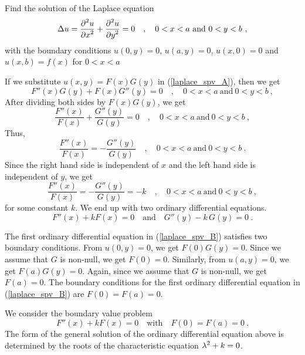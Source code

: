 \begin{egg}
Find the solution of the Laplace equation
\begin{equation} \label{laplace_spv_A}
\Delta u = \frac{\displaystyle \partial^{2}{u}} {\displaystyle \partial x^{2}} + \frac{\displaystyle \partial^{2}{u}} {\displaystyle \partial y^{2}} = 0 \quad ,
\quad 0 < x < a \ \text{and} \ 0 < y < b \ ,
\end{equation}
with the boundary conditions $u(0,y) = 0$, $u(a,y)=0$, $u(x,0)=0$
and $u(x,b) = f(x)$ for $0<x<a$

If we substitute $u(x,y) = F(x)G(y)$ in (\ref{laplace_spv_A}), then we get
\[
F''(x)G(y) + F(x)G''(y) = 0 \quad , \quad  0 < x < a \ \text{and}
\ 0 < y < b \ ,
\]
After dividing both sides by $F(x)G(y)$, we get
\[
\frac{F''(x)}{F(x)} + \frac{G''(y)}{G(y)} = 0 \quad , \quad
 0 < x < a \ \text{and} \ 0 < y < b \ ,
\]
Thus,
\[
\frac{F''(x)}{F(x)} = - \frac{G''(y)}{G(y)} \quad , \quad
 0 < x < a \ \text{and} \ 0 < y < b \ .
\]
Since the right hand side is independent of $x$ and the left hand side
is independent of $y$, we get
\[
\frac{F''(x)}{F(x)} = - \frac{G''(y)}{G(y)} = -k \quad , \quad
 0 < x < a \ \text{and} \ 0 < y < b \ ,
\]
for some constant $k$.  We end up with two ordinary differential equations.
\begin{equation} \label{laplace_spv_B}
F''(x) + k F(x) = 0 \quad \text{and}
\quad G''(y) - k\,G(y) = 0 \ .
\end{equation}

The first ordinary differential equation in (\ref{laplace_spv_B})
satisfies two boundary conditions.   From $u(0,y) = 0$, we get
$F(0)G(y)=0$.  Since we assume that $G$ is non-null, we get
$F(0)=0$.  Similarly, from $u(a,y) = 0$, we get $F(a)G(y)=0$.  Again,
since we assume that $G$ is non-null, we get $F(a)=0$.  The
boundary conditions for the first ordinary differential equation in
(\ref{laplace_spv_B}) are $F(0)=F(a)=0$. 

We consider the boundary value problem
\begin{equation} \label{laplace_spv_C}
F''(x) + k F(x) = 0 \quad \text{with} \quad F(0)=F(a)=0  \ .
\end{equation}
The form of the general solution of the ordinary differential equation
above is determined by the roots of the characteristic equation
$\displaystyle \lambda^2+k=0$.


\end{egg}
